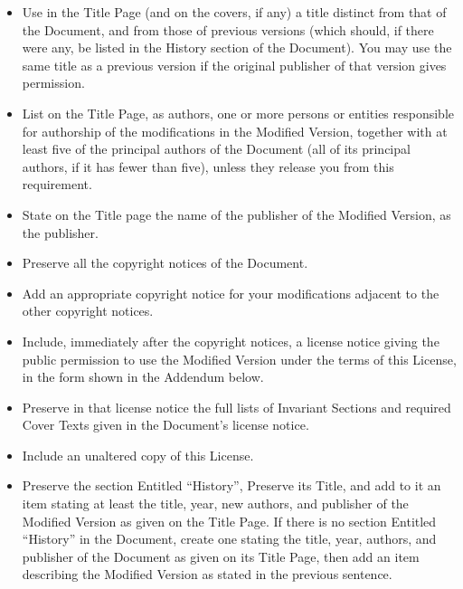 \documentclass[a4paper,openany]{book}
\begin{document}
\begin{results}
\begin{itemize}
\item[A.]
 Use in the Title Page (and on the covers, if any) a title distinct
 from that of the Document, and from those of previous versions
 (which should, if there were any, be listed in the History section
 of the Document). You may use the same title as a previous version
 if the original publisher of that version gives permission.

\item[B.]
 List on the Title Page, as authors, one or more persons or entities
 responsible for authorship of the modifications in the Modified
 Version, together with at least five of the principal authors of the
 Document (all of its principal authors, if it has fewer than five),
 unless they release you from this requirement.

\item[C.]
 State on the Title page the name of the publisher of the
 Modified Version, as the publisher.

\item[D.]
 Preserve all the copyright notices of the Document.

\item[E.]
 Add an appropriate copyright notice for your modifications
 adjacent to the other copyright notices.

\item[F.]
 Include, immediately after the copyright notices, a license notice
 giving the public permission to use the Modified Version under the
 terms of this License, in the form shown in the Addendum below.

\item[G.]
 Preserve in that license notice the full lists of Invariant Sections
 and required Cover Texts given in the Document's license notice.

\item[H.]
 Include an unaltered copy of this License.

\item[I.]
 Preserve the section Entitled ``History'', Preserve its Title, and add
 to it an item stating at least the title, year, new authors, and
 publisher of the Modified Version as given on the Title Page. If
 there is no section Entitled ``History'' in the Document, create one
 stating the title, year, authors, and publisher of the Document as
 given on its Title Page, then add an item describing the Modified
 Version as stated in the previous sentence.


\end{itemize}
\end{results}
\end{document}
